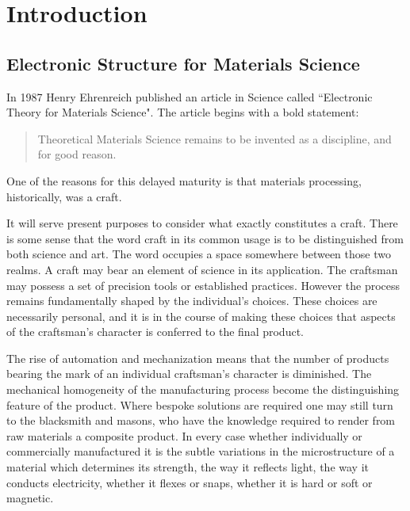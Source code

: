 \chapter{Introduction}
\section{Electronic Structure for Materials Science}
In 1987 Henry Ehrenreich published an article in Science called
``Electronic Theory for Materials Science"\cite{ehrenreich87}. The article begins
with a bold statement:

\begin{quote}
Theoretical Materials Science remains to be invented as a discipline, and for good reason.
\end{quote}

One of the reasons for this delayed maturity is that materials processing, 
historically, was a craft.

It will serve present purposes to consider what exactly constitutes a craft. 
There is some sense that the word craft in its common usage 
is to be distinguished from both science and art.
The word occupies a space somewhere between those two realms. 
A craft may bear an element of science in its application. 
The craftsman may possess a set of precision tools or 
established practices. However the process remains fundamentally shaped by 
the individual's choices. These choices are necessarily personal,
and it is in the course of making these choices that aspects 
of the craftsman's character is conferred to the final product. 

The rise of automation and mechanization means that the 
number of products bearing the mark of an individual craftsman's 
character is diminished. The mechanical homogeneity of the manufacturing process
become the distinguishing feature of the product. Where bespoke solutions are 
required one may still turn to the blacksmith and masons, who have the knowledge 
required to render from raw materials a composite product. In every case
whether individually or commercially manufactured it is the subtle
variations in the microstructure of a material which determines its 
strength, the way it reflects light, the way it conducts electricity, 
whether it flexes or snaps, whether it is hard or soft or magnetic.

